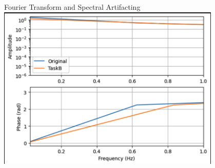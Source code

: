 \begin{frame}{Fourier Transform and Spectral Artifacting}
    \centering
    \includegraphics[height=0.8\textheight,width=0.8\textwidth,keepaspectratio]{images/Amp_Vs_Freq.png}
\end{frame}

